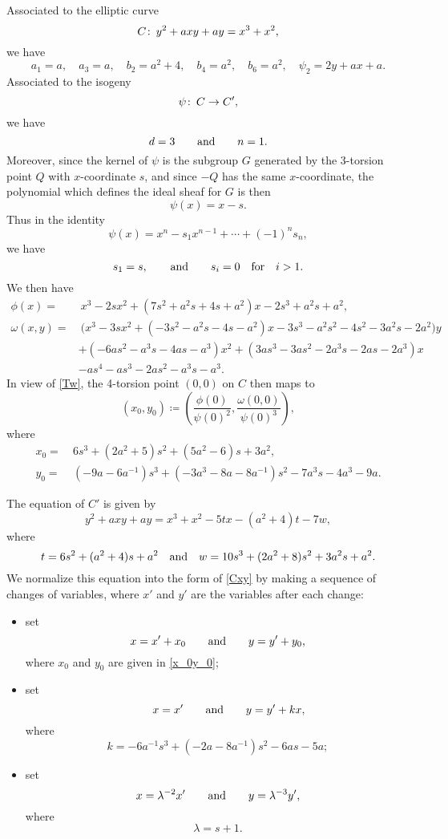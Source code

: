 \documentclass{gtpart}
\theoremstyle{definition}
\theoremstyle{remark}
\def\co{\colon\thinspace}
\newcommand{\ad}{{\rm and}}
\begin{document}
Associated to the elliptic curve 
\[
 C \co y^2 + a x y + a y = x^3 + x^2, 
\]
we have 
\[
 a_1 = a, \quad a_3 = a, \quad b_2 = a^2 + 4, \quad b_4 = a^2, \quad b_6 = a^2, \quad \psi_2 = 2 y + a x + a.  
\]
Associated to the isogeny 
\[
 \psi \co C \to C', 
\]
we have 
\[
 d = 3 \qquad \ad \qquad n = 1.  
\]
Moreover, since the kernel of $\psi$ is the subgroup $G$ generated by the 3-torsion point $Q$ with $x$-coordinate $s$, 
and since $-Q$ has the same $x$-coordinate, the polynomial which defines the ideal sheaf for $G$ is then 
\[
 \psi(x) = x - s.  
\]
Thus in the identity 
\[
 \psi(x) = x^n - s_1 x^{n-1} + \cdots + (-1)^n s_n, 
\]
we have 
\[
 s_1 = s, \qquad \ad \qquad s_i = 0 \quad \text{for} \quad i > 1.  
\]
We then have 
\begin{equation*}
\begin{split}
     \phi(x) = & ~ x^3 - 2 s x^2 + (7 s^2+ a^2 s + 4 s + a^2) x - 2 s^3 + a^2 s + a^2, \\
 \omega(x,y) = & ~ \big( x^3 - 3 s x^2 + (-3 s^2 - a^2 s - 4 s - a^2) x - 3 s^3 - a^2 s^2 - 4 s^2 - 3 a^2 s - 2 a^2 \big) y \\
               & + (-6 a s^2 - a^3 s - 4 a s - a^3) x^2 + (3 a s^3 - 3 a s^2 -2 a^3 s - 2 a s - 2 a^3) x \\
               & - a s^4 - a s^3 - 2 a s^2 - a^3 s - a^3.  
\end{split}
\end{equation*}
In view of \eqref{Tw}, the 4-torsion point $(0,0)$ on $C$ then maps to 
\[
 (x_0, y_0) \coloneqq \left( \frac{\phi(0)}{\psi(0)^2}, \frac{\omega(0,0)}{\psi(0)^3} \right), 
\]
where 
\begin{equation}
\label{x_0y_0}
\begin{split}
 x_0 = & ~ 6 s^3 + (2 a^2 + 5) s^2 + (5 a^2 - 6) s + 3 a^2, \\
 y_0 = & ~ (- 9 a - 6 a^{-1}) s^3 + (-3 a^3 - 8 a - 8 a^{-1}) s^2 - 7 a^3 s - 4 a^3 - 9 a.  
\end{split}
\end{equation}

The equation of $C'$ is given by 
\[
 y^2 + a x y + a y = x^3 + x^2 - 5 t x - (a^2 + 4) t - 7 w, 
\]
where 
\[
 t = 6 s^2 + (a^2 + 4) s + a^2 \quad \ad \quad w = 10 s^3 + (2 a^2 + 8) s^2 + 3 a^2 s + a^2.  
\]
We normalize this equation into the form of \eqref{Cxy} by making a sequence of changes of variables, where $x'$ and $y'$ are the variables after each change: 
\begin{itemize}
 \item set 
 \[
  ~x = x' + x_0 \qquad \ad \qquad y = y' + y_0,~ 
 \]
 where $x_0$ and $y_0$ are given in \eqref{x_0y_0}; 

 \item set 
 \[
  \qquad x = x' \qquad \ad \qquad y = y' + k x, 
 \]
 where 
 \[
  k = -6 a^{-1} s^3 + (-2 a - 8 a^{-1}) s^2 - 6 a s - 5 a; 
 \]

 \item set 
 \[
  x = \lambda^{-2} x' \qquad \ad \qquad y = \lambda^{-3} y', 
 \]
 where 
 \[
  \lambda = s + 1.  
 \]
\end{itemize}
\end{document}
